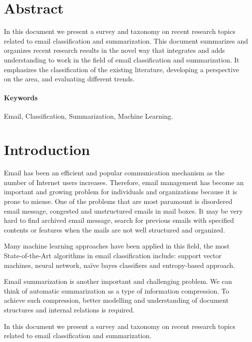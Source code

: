 \documentclass[12pt]{article}
\begin{document}
\maketitle
\newpage
\tableofcontents
\newpage

\section{Abstract}
In this document we present a survey and taxonomy on recent research topics related to email classification and summarization. This document summarizes and organizes recent research results in the novel way that integrates and adds understanding to work in the field of email classification and summarization. It emphasizes the classification of the existing literature, developing a perspective on the area, and evaluating different trends.

\paragraph{Keywords}
Email, Classification, Summarization, Machine Learning.

\section{Introduction}
Email has been an efficient and popular communication mechanism as the number of Internet users increases. Therefore, email management has become an important and growing problem for individuals and organizations because it is prone to misuse. One of the problems that are most paramount is disordered email message, congested and unstructured emails in mail boxes. It may be very hard to find archived email message, search for previous emails with specified contents or features when the mails are not well structured and organized.

Many machine learning approaches have been applied in this field, the most State-of-the-Art algorithms in email classification include: support vector machines, neural network, naïve bayes classifiers and entropy-based approach. 

Email summarization is another important and challenging problem. We can think of automatic summarization as a type of information compression. To achieve such compression, better modelling and understanding of document structures and internal relations is required. 

In this document we present a survey and taxonomy on recent research topics related to email classification and summarization.
\end{document}
